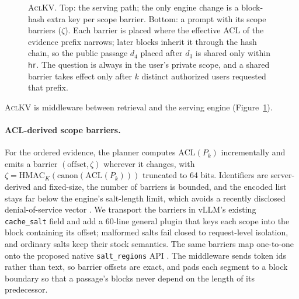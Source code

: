 \documentclass[11pt]{article}
\newcommand{\sysname}{\textsc{AclKV}\xspace}
\newcommand{\acl}{\mathrm{ACL}}
\begin{document}
\begin{figure}[t]
{}
\caption{\sysname. Top: the serving path; the only engine change is a block-hash extra key per scope barrier. Bottom: a prompt with its scope barriers ($\zeta$). Each barrier is placed where the effective ACL of the evidence prefix narrows; later blocks inherit it through the hash chain, so the public passage $d_4$ placed after $d_3$ is shared only within \texttt{hr}. The question is always in the user's private scope, and a shared barrier takes effect only after $k$ distinct authorized users requested that prefix.}
\label{fig:overview}
\end{figure}

\sysname is middleware between retrieval and the serving engine (Figure~\ref{fig:overview}).

\paragraph{ACL-derived scope barriers.} For the ordered evidence, the planner computes $\acl(P_k)$ incrementally and emits a barrier $(\text{offset}, \zeta)$ wherever it changes, with $\zeta=\mathrm{HMAC}_K(\mathrm{canon}(\acl(P_k)))$ truncated to 64 bits. Identifiers are server-derived and fixed-size, the number of barriers is bounded, and the encoded list stays far below the engine's salt-length limit, which avoids a recently disclosed denial-of-service vector \citep{vllm2026dos}. We transport the barriers in vLLM's existing \texttt{cache\_salt} field and add a 60-line general plugin that keys each scope into the block containing its offset; malformed salts fail closed to request-level isolation, and ordinary salts keep their stock semantics. The same barriers map one-to-one onto the proposed native \texttt{salt\_regions} API \citep{vllm2026saltregions}. The middleware sends token ids rather than text, so barrier offsets are exact, and pads each segment to a block boundary so that a passage's blocks never depend on the length of its predecessor.
\end{document}
